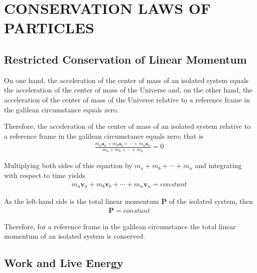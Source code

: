 \documentclass[12pt]{article}
\newcommand{\yN}{\newpage}%
\newcommand{\yT}{\bigskip}%
\newcommand{\yS}{\medskip}%
\newcommand{\cA}{\centering}%
\newcommand{\cT}{\cA\section}%
\newcommand{\cS}{\cA\subsection}%
\newcommand{\ct}[1]{}%
\newcommand{\cs}[1]{}%
\newcommand{\vA}{\mathbf{a}}
\newcommand{\vP}{\mathbf{P}}
\newcommand{\vV}{\mathbf{v}}
\newcommand{\mM}{m}
\newcommand{\ra}{_a}
\newcommand{\rb}{_b}
\newcommand{\rn}{_n}
\newcommand{\tc}{constant}
\begin{document}
\yT \vspace{0em}

{\ct{CONSERVATION LAWS OF PARTICLES}}
{\cT{CONSERVATION LAWS OF PARTICLES}}

{\cs{Restricted Conservation of Linear Momentum}}
{\cS{Restricted Conservation of Linear Momentum}}

\par On one hand, the acceleration of the center of mass of an isolated system equals the acceleration of the center of mass of the Universe and, on the other hand, the acceleration of the center of mass of the Universe relative to a reference frame in the galilean circumstance equals zero.

\yN \baselineskip=14.5pt \enlargethispage{0em}

\par Therefore, the acceleration of the center of mass of an isolated system relative to a reference frame in the galilean circumstance equals zero; that is
\begin{eqnarray*}
\frac{\mM\ra\vA\ra + \mM\rb\vA\rb + \cdots + \mM\rn\vA\rn}{\mM\ra + \mM\rb + \cdots + \mM\rn} = 0
\end{eqnarray*}
\par Multiplying both sides of this equation by $\mM\ra + \mM\rb + \cdots + \mM\rn$ and integrating with respect to time yields
\begin{eqnarray*}
\mM\ra\vV\ra + \mM\rb\vV\rb + \cdots + \mM\rn\vV\rn = \tc
\end{eqnarray*}
\par As the left-hand side is the total linear momentum $\vP$ of the isolated system, then
\begin{eqnarray*}
\vP = \tc
\end{eqnarray*}
\par Therefore, for a reference frame in the galilean circumstance the total linear momentum of an isolated system is conserved.

\yS \vspace{-1.5em}

{\cs{Work and Live Energy}}
{\cS{Work and Live Energy}}
\end{document}
